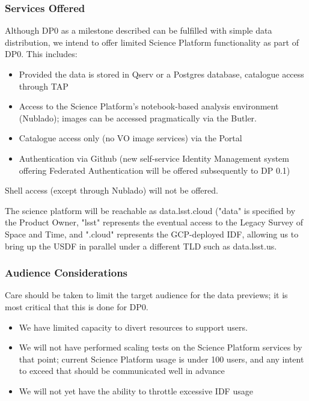 \subsubsection{Services Offered}

Although DP0 as a milestone described  can be fulfilled with simple data distribution, we intend to offer limited Science Platform functionality as part of DP0. This includes:

\begin{itemize}

\item Provided the data is stored in Qserv or a Postgres database, catalogue access through TAP

\item Access to the Science Platform's notebook-based analysis environment (Nublado); images can be accessed pragmatically via the Butler.

\item Catalogue access only (no VO image services) via the Portal

\item Authentication via Github (new self-service Identity Management system offering Federated Authentication will be offered subsequently to DP 0.1)

\end{itemize}

Shell access (except through Nublado) will not be offered.

The science platform will be reachable as data.lsst.cloud ("data" is specified by the Product Owner, "lsst" represents the eventual access to the Legacy Survey of Space and Time, and ".cloud" represents the GCP-deployed IDF, allowing us to bring up the USDF in parallel under a different TLD such as data.lsst.us.

\subsubsection{Audience Considerations}

Care should be taken to limit the target audience for the data previews; it is most critical that this is done for DP0.

\begin{itemize}

\item We have limited capacity to divert resources to support users.

\item We will not have performed scaling tests on the Science Platform services by that point; current Science Platform usage is under 100 users, and any intent to exceed that should be communicated well in advance

\item We will not yet have the ability to throttle excessive IDF usage

\end{itemize}

